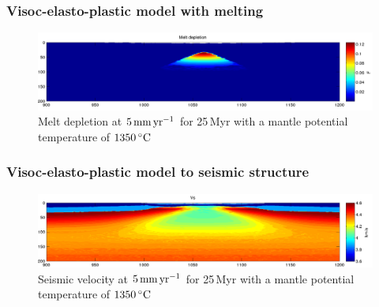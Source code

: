 \documentclass[aspectratio=169]{beamer}
\begin{document}
\begin{frame}
    \frametitle{Visoc-elasto-plastic model with melting}
    \begin{figure}
        \includegraphics[width=0.8\paperwidth]{./figures/MESS2.png}
        \caption{Melt depletion at $5\rm\,mm\,yr^{-1}$ for 25\,Myr with a mantle potential temperature of $1350\,^{\circ}\rm C$}
    \end{figure}
\end{frame}

\begin{frame}
    \frametitle{Visoc-elasto-plastic model to seismic structure}
    \begin{figure}
        \includegraphics[width=0.8\paperwidth]{./figures/MER1.png}
        \caption{Seismic velocity at $5\rm\,mm\,yr^{-1}$ for 25\,Myr with a mantle potential temperature of $1350\,^{\circ}\rm C$}
    \end{figure}
\end{frame}
\end{document}
